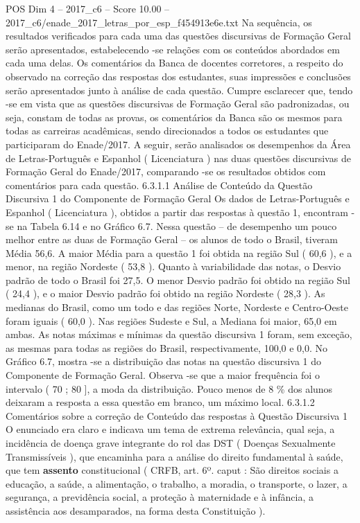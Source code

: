\begin{textsample}{POS Dim 4 – 2017\_c6 – Score 10.00 – 2017\_c6/enade\_2017\_letras\_por\_esp\_f454913e6e.txt}
Na sequência, os resultados verificados para cada uma das questões discursivas de Formação Geral serão apresentados, estabelecendo -se relações com os conteúdos abordados em cada uma delas.
Os comentários da Banca de docentes corretores, a respeito do observado na correção das respostas dos estudantes, suas impressões e conclusões serão apresentados junto à análise de cada questão.
Cumpre esclarecer que, tendo -se em vista que as questões discursivas de Formação Geral são padronizadas, ou seja, constam de todas as provas, os comentários da Banca são os mesmos para todas as carreiras acadêmicas, sendo direcionados a todos os estudantes que participaram do Enade/2017.
A seguir, serão analisados os desempenhos da Área de Letras-Português e Espanhol ( Licenciatura ) nas duas questões discursivas de Formação Geral do Enade/2017, comparando -se os resultados obtidos com comentários para cada questão. 6.3.1.1 Análise de Conteúdo da Questão Discursiva 1 do Componente de Formação Geral Os dados de Letras-Português e Espanhol ( Licenciatura ), obtidos a partir das respostas à questão 1, encontram -se na Tabela 6.14 e no Gráfico 6.7.
Nessa questão – de desempenho um pouco melhor entre as duas de Formação Geral – os alunos de todo o Brasil, tiveram Média 56,6.
A maior Média para a questão 1 foi obtida na região Sul ( 60,6 ), e a menor, na região Nordeste ( 53,8 ).
Quanto à variabilidade das notas, o Desvio padrão de todo o Brasil foi 27,5.
O menor Desvio padrão foi obtido na região Sul ( 24,4 ), e o maior Desvio padrão foi obtido na região Nordeste ( 28,3 ).
As medianas do Brasil, como um todo e das regiões Norte, Nordeste e Centro-Oeste foram iguais ( 60,0 ).
Nas regiões Sudeste e Sul, a Mediana foi maior, 65,0 em ambas.
As notas máximas e mínimas da questão discursiva 1 foram, sem exceção, as mesmas para todas as regiões do Brasil, respectivamente, 100,0 e 0,0.
No Gráfico 6.7, mostra -se a distribuição das notas na questão discursiva 1 do Componente de Formação Geral.
Observa -se que a maior frequência foi o intervalo ( 70 ; 80 ], a moda da distribuição.
Pouco menos de 8 \% dos alunos deixaram a resposta a essa questão em branco, um máximo local. 6.3.1.2 Comentários sobre a correção de Conteúdo das respostas à Questão Discursiva 1 O enunciado era claro e indicava um tema de extrema relevância, qual seja, a incidência de doença grave integrante do rol das DST ( Doenças Sexualmente Transmissíveis ), que encaminha para a análise do direito fundamental à saúde, que tem \textbf{assento} constitucional ( CRFB, art. 6º. caput : São direitos sociais a educação, a saúde, a alimentação, o trabalho, a moradia, o transporte, o lazer, a segurança, a previdência social, a proteção à maternidade e à infância, a assistência aos desamparados, na forma desta Constituição ).

\end{textsample}
